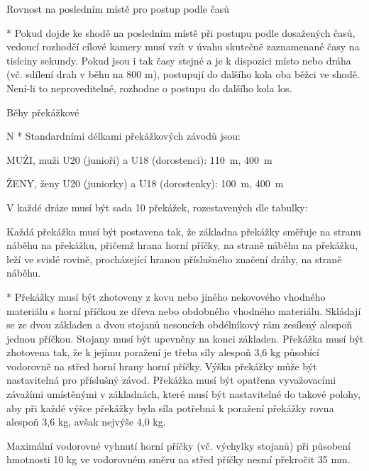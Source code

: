Rovnost na posledním místě pro postup podle časů

* Pokud dojde ke shodě na posledním místě při postupu podle dosažených časů, vedoucí rozhodčí cílové kamery musí vzít v úvahu skutečně zaznamenané časy na tisíciny sekundy. Pokud jsou i tak časy stejné a je k dispozici místo nebo dráha (vč. sdílení drah v běhu na 800 m), postupují do dalšího kola oba běžci ve shodě. Není-li to neproveditelné, rozhodne o postupu do dalšího kola los.
\enditems

\secc Běhy překážkové

\begitems \style N
* Standardními délkami překážkových závodů jsou:

MUŽI, muži U20 (junioři) a U18 (dorostenci): 110~m, 400~m

ŽENY, ženy U20 (juniorky) a U18 (dorostenky): 100~m, 400~m

V každé dráze musí být sada 10 překážek, rozestavených dle tabulky:


Každá překážka musí být postavena tak, že základna překážky směřuje na stranu náběhu na překážku, přičemž hrana horní příčky, na straně náběhu na překážku, leží ve svislé rovině, procházející hranou příslušného značení dráhy, na straně náběhu.

* Překážky musí být zhotoveny z kovu nebo jiného nekovového vhodného materiálu s horní příčkou ze dřeva nebo obdobného vhodného materiálu. Skládají se ze dvou základen a dvou stojanů nesoucích obdélníkový rám zesílený alespoň jednou příčkou. Stojany musí být upevněny na konci základen. Překážka musí být zhotovena tak, že k jejímu poražení je třeba síly alespoň 3,6 kg působící vodorovně na střed horní hrany horní příčky. Výška překážky může být nastavitelná pro příslušný závod. Překážka musí být opatřena vyvažovacími závažími umístěnými v základnách, které musí být nastavitelné do takové polohy, aby při každé výšce překážky byla síla potřebná k poražení překážky rovna alespoň 3,6 kg, avšak nejvýše 4,0 kg.

Maximální vodorovné vyhnutí horní příčky (vč. výchylky stojanů) při působení hmotnosti 10 kg ve vodorovném směru na střed příčky nesmí překročit 35 mm.

